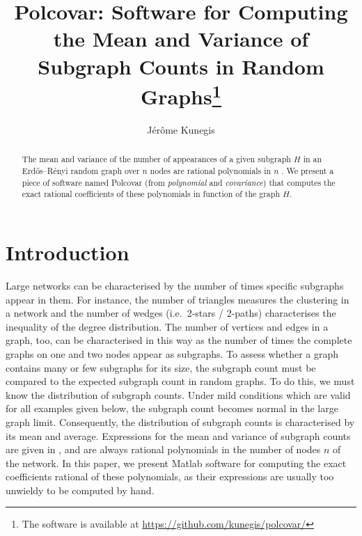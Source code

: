 \documentclass{article}
\title{ 
  Polcovar:  
  Software for Computing the Mean and Variance of Subgraph Counts
  in Random Graphs\footnote{The software is available at \url{https://github.com/kunegis/polcovar/}}
}
\begin{document}
\author{ Jérôme Kunegis }
\maketitle

\begin{abstract}
The mean and variance of the number of appearances of a given subgraph $H$
in an Erdős--Rényi random graph over $n$ nodes are rational polynomials
in $n$ \cite{gp6}.   
We present a piece of software named Polcovar (from \emph{polynomial}
and \emph{covariance}) that computes the exact rational coefficients of
these polynomials in function of the graph $H$.  
\end{abstract}

\section{Introduction}
Large networks can be characterised by the number of times specific
subgraphs appear in them.  For instance, the number of triangles
measures the clustering in a network and the number of wedges
(i.e.\ 2-stars / 2-paths) characterises the inequality of the degree
distribution.  The number of vertices and edges in a graph, too, can be
characterised in this way as the number of times the complete graphs on
one and two nodes appear as subgraphs.  To assess whether a graph
contains many or few subgraphs for its size, the subgraph count must be
compared to the expected subgraph count in random graphs.  To do this,
we must know the distribution of subgraph counts.  Under mild conditions
which are valid for all examples given below, the subgraph count becomes
normal in the large graph limit.  Consequently, the distribution of
subgraph counts is characterised by its mean and average.  Expressions
for the mean and variance of subgraph counts are given in \cite{gp6},
and are always rational polynomials in the number of nodes $n$ of the network.
In this paper, we present Matlab software for computing the exact
coefficients rational
of these polynomials, as their expressions are usually too unwieldy to
be computed by hand. 
\end{document}
